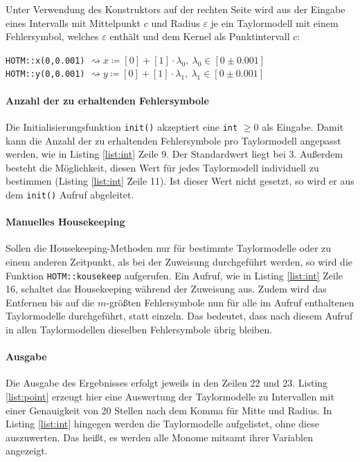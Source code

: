  
 Unter Verwendung des Konstruktors auf der rechten Seite wird aus der Eingabe eines Intervalls mit Mittelpunkt $c$ und Radius $\varepsilon$ je ein Taylormodell mit einem Fehlersymbol, welches $\varepsilon$ enthält und dem Kernel als Punktintervall $c$: 
 \begin{center}
  \verb+HOTM::x(0,0.001)+ $\rightsquigarrow x\coloneqq [0] + [1] \cdot \lambda_0,\ \lambda_0 \in [0 \pm 0.001]$\\
  \verb+HOTM::y(0,0.001)+ $\rightsquigarrow y\coloneqq[0] + [1] \cdot \lambda_1,\ \lambda_1 \in [0 \pm 0.001]$
 \end{center}

\paragraph{Anzahl der zu erhaltenden Fehlersymbole}
Die Initialisierungsfunktion \verb+init()+ akzeptiert eine \verb+int+ $\geq 0$ als Eingabe. Damit kann die Anzahl der zu erhaltenden Fehlersymbole pro Taylormodell angepasst werden, wie in  Listing \ref{list:int} Zeile 9. Der Standardwert liegt bei 3. Außerdem besteht die Möglichkeit, diesen Wert für jedes Taylormodell individuell zu bestimmen (Listing \ref{list:int} Zeile 11). Ist dieser Wert nicht gesetzt, so wird er aus dem \verb+init()+ Aufruf abgeleitet.

\paragraph{Manuelles Housekeeping}
 Sollen die Housekeeping-Methoden nur für bestimmte Taylormodelle oder zu einem anderen Zeitpunkt, als bei der Zuweisung durchgeführt werden, so wird die Funktion \verb+HOTM::kousekeep+ aufgerufen. Ein Aufruf, wie in Listing \ref{list:int} Zeile 16, schaltet das Housekeeping während der Zuweisung aus. Zudem wird das Entfernen bis auf die $m$-größten Fehlersymbole nun für alle im Aufruf enthaltenen Taylormodelle durchgeführt, statt einzeln. Das bedeutet, dass nach diesem Aufruf in allen Taylormodellen dieselben Fehlersymbole übrig bleiben.
 
\paragraph{Ausgabe}
 Die Ausgabe des Ergebnisses erfolgt jeweils in den Zeilen 22 und 23. Listing \ref{list:point} erzeugt hier eine Auswertung der Taylormodelle zu Intervallen mit einer Genauigkeit von 20 Stellen nach dem Komma für Mitte und Radius. In Listing \ref{list:int} hingegen werden die Taylormodelle aufgelistet, ohne diese auszuwerten. Das heißt, es werden alle Monome mitsamt ihrer Variablen angezeigt.
 
